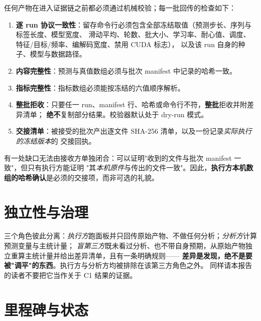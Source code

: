 \documentclass[conference]{IEEEtran}
\begin{document}
任何产物在进入证据链之前都必须通过机械校验；每一批回传的检查如下：

\begin{enumerate}
\item \textbf{逐 run 协议一致性}：留存命令行必须包含全部冻结取值（预测步长、序列与标签长度、模型宽度、
滑动平均、轮数、批大小、学习率、耐心值、调度、特征/目标/频率、编解码宽度、禁用 CUDA 标志），
以及该 run 自身的种子、模型与数据路径。
\item \textbf{内容完整性}：预测与真值数组必须与批次 manifest 中记录的哈希一致。
\item \textbf{指标完整性}：指标数组必须能按冻结的六值顺序解析。
\item \textbf{整批拒收}：只要任一 run、manifest 行、哈希或命令行不符，\textbf{整批}拒收并附差异清单；
\textbf{绝不}复制部分结果。校验器默认处于 dry-run 模式。
\item \textbf{交接清单}：被接受的批次产出逐文件 SHA-256 清单，以及一份记录\emph{实际执行的冻结版本}的
交接回执。
\end{enumerate}

有一处缺口无法由接收方单独闭合：可以证明"收到的文件与批次 manifest 一致"，但只有执行方能证明
"其\emph{本机原件}与传出的文件一致"。因此，\textbf{执行方本机数组的哈希确认}是必须的交接项，而非可选的礼貌。

\section{独立性与治理}
\label{sec:gov}

三个角色彼此分离：\emph{执行方}跑面板并只回传原始产物、不做任何分析；\emph{分析方}计算预测变量与主统计量；
\emph{盲第三方}既未看过分析、也不带自身预期，从原始产物独立重算主统计量并给出差异清单，且有一条明确规则——
\textbf{差异是发现，绝不是要被"调平"的东西}。执行方与分析方均被排除在该第三方角色之外。
同样请本报告的读者不要把它当作关于 C1 结果的证据。

\section{里程碑与状态}
\label{sec:mil}
\end{document}
